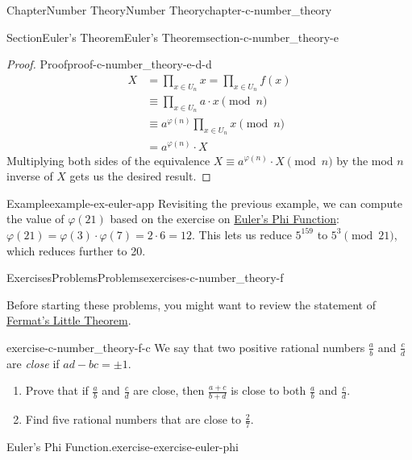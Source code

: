 \documentclass[oneside,10pt,]{book}
\numberwithin{equation}{section}
\begin{document}
\begin{chapterptx}{Chapter}{Number Theory}{}{Number Theory}{}{}{chapter-c-number_theory}
\begin{sectionptx}{Section}{Euler's Theorem}{}{Euler's Theorem}{}{}{section-c-number_theory-e}
\begin{proof}{Proof}{}{proof-c-number_theory-e-d-d}
\begin{equation*}
\begin{split}
X  &= \prod_{x \in U_n} x =  \prod_{x \in U_n} f(x) \\
&\equiv  \prod_{x \in U_n} a\cdot x \pmod{n} \\
&\equiv  a^{\varphi(n)} \prod_{x \in U_n}  x \pmod{n} \\
& = a^{\varphi(n)} \cdot X
\end{split}
\end{equation*}
Multiplying both sides of the equivalence \(X \equiv a^{\varphi(n)} \cdot X \pmod{n}\) by the mod \(n\) inverse of \(X\) gets us the desired result.%
\end{proof}
\begin{example}{Example}{}{example-ex-euler-app}%
Revisiting the previous example, we can compute the value of \(\varphi(21)\) based on the exercise on \hyperlink{exercise-exercise-euler-phi}{Euler's Phi Function}:  \(\varphi(21)=\varphi(3)\cdot\varphi(7)=2 \cdot 6 = 12\).  This lets us reduce \(5^{159}\) to \(5^{3} \pmod{21}\), which reduces further to 20.%
\end{example}
\end{sectionptx}
%
%
\typeout{************************************************}
\typeout{************************************************}
%
\begin{exercises-section}{Exercises}{Problems}{}{Problems}{}{}{exercises-c-number_theory-f}
\begin{introduction}{}%
Before starting these problems, you might want to review the statement of \hyperref[theorem-theorem-fermat-little]{Fermat's Little Theorem}.%
\end{introduction}%
\begin{divisionexercise}{1}{}{}{exercise-c-number_theory-f-c}%
We say that two positive rational numbers \(\frac{a}{b}\) and \(\frac{c}{d}\) are \emph{close} if \(a d - b c = \pm 1\).%
\begin{enumerate}[label=(\alph*)]
\item{}Prove that if \(\frac{a}{b}\) and \(\frac{c}{d}\) are close, then \(\frac{a+c}{b+d}\) is close to both \(\frac{a}{b}\) and \(\frac{c}{d}\).%
\item{}Find five rational numbers that are close to \(\frac{2}{7}\).%
\end{enumerate}
%
\end{divisionexercise}%
\begin{divisionexercise}{2}{Euler's Phi Function.}{}{exercise-exercise-euler-phi}%

\end{divisionexercise}
\end{exercises-section}
\end{chapterptx}
\end{document}
